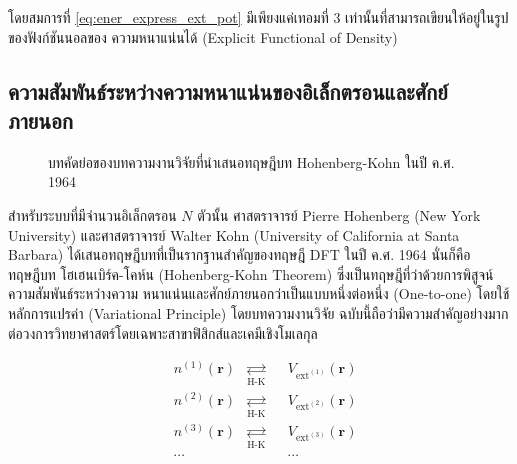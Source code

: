 \noindent โดยสมการที่ \eqref{eq:ener_express_ext_pot} มีเพียงแค่เทอมที่ 3 เท่านั้นที่สามารถเขียนให้อยู่ในรูปของฟังก์ชันนอลของ%
ความหนาแน่นได้ (Explicit Functional of Density)

\subsection{ความสัมพันธ์ระหว่างความหนาแน่นของอิเล็กตรอนและศักย์ภายนอก}
\label{ssec:ener_density_ext_pot}

\begin{figure}[H]
    \centering
    \caption{บทคัดย่อของบทความงานวิจัยที่นำเสนอทฤษฎีบท Hohenberg-Kohn ในปี ค.ศ. 1964}
    \label{fig:hohenberg_kohn_abs}
\end{figure}

สำหรับระบบที่มีจำนวนอิเล็กตรอน $N$ ตัวนั้น ศาสตราจารย์ Pierre Hohenberg (New York University) และศาสตราจารย์ Walter Kohn
(University of California at Santa Barbara) ได้เสนอทฤษฎีบทที่เป็นรากฐานสำคัญของทฤษฎี DFT ในปี ค.ศ. 1964 นั่นก็คือทฤษฎีบท%
โฮเฮนเบิร์ค-โคห์น (Hohenberg-Kohn Theorem)\autocite{hohenberg1964} ซึ่งเป็นทฤษฎีที่ว่าด้วยการพิสูจน์ความสัมพันธ์ระหว่างความ%
หนาแน่นและศักย์ภายนอกว่าเป็นแบบหนึ่งต่อหนึ่ง (One-to-one) โดยใช้หลักการแปรค่า (Variational Principle) โดยบทความงานวิจัย%
ฉบับนี้ถือว่ามีความสำคัญอย่างมากต่อวงการวิทยาศาสตร์โดยเฉพาะสาขาฟิสิกส์และเคมีเชิงโมเลกุล

\begin{framed}
    \centering
    \begin{align*}
         & n^{(1)}(\bm{r}) & \underset{\text{H-K}}{\rightleftarrows} &  & V_{\text{ext}^{(1)}}(\bm{r}) \\[0.5ex]
         & n^{(2)}(\bm{r}) & \underset{\text{H-K}}{\rightleftarrows} &  & V_{\text{ext}^{(2)}}(\bm{r}) \\[0.5ex]
         & n^{(3)}(\bm{r}) & \underset{\text{H-K}}{\rightleftarrows} &  & V_{\text{ext}^{(3)}}(\bm{r}) \\[0.5ex]
         & \cdots          &                                         &  & \cdots
    \end{align*}
\end{framed}

